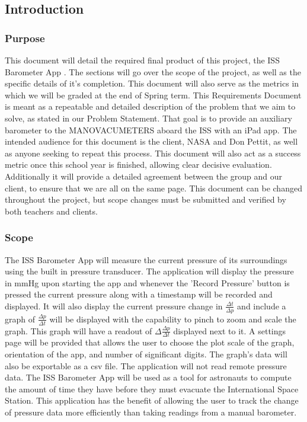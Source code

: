 \documentclass[onecolumn, draftclsnofoot,10pt, compsoc]{IEEEtran}
\def \CapstoneProjectName{ISS Barometer App }
\begin{document}
\subsection{Introduction}

\subsubsection{Purpose}
This document will detail the required final product of this project, the \CapstoneProjectName.
The sections will go over the scope of the project, as well as the specific details of it's completion.
This document will also serve as the metrics in which we will be graded at the end of Spring term.
This Requirements Document is meant as a repeatable and detailed description of the problem that we aim to solve, as stated in our Problem Statement.
That goal is to provide an auxiliary barometer to the MANOVACUMETERS aboard the ISS with an iPad app.
The intended audience for this document is the client, NASA and Don Pettit, as well as anyone seeking to repeat this process.
This document will also act as a success metric once this school year is finished, allowing clear decisive evaluation.
Additionally it will provide a detailed agreement between the group and our client, to ensure that we are all on the same page.
This document can be changed throughout the project, but scope changes must be submitted and verified by both teachers and clients.

\subsubsection{Scope}
The \CapstoneProjectName will measure the current pressure of its surroundings using the built in pressure transducer.
The application will display the pressure in mmHg upon starting the app and whenever the 'Record Pressure' button is pressed the current pressure along with a timestamp will be recorded and displayed.
It will also display the current pressure change in $\frac{\Delta t}{\Delta p}$ and include a graph of $\frac{\Delta p}{\Delta t}$ will be displayed with the capability to pinch to zoom and scale the graph.
This graph will have a readout of $\Delta \frac{\Delta p}{\Delta t}$ displayed next to it.
A settings page will be provided that allows the user to choose the plot scale of the graph, orientation of the app, and number of significant digits.
The graph's data will also be exportable as a csv file.
The application will not read remote pressure data.
The \CapstoneProjectName will be used as a tool for astronauts to compute the amount of time they have before they must evacuate the International Space Station.
This application has the benefit of allowing the user to track the change of pressure data more efficiently than taking readings from a manual barometer.
\end{document}
